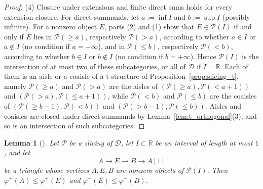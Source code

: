 \documentclass[12pt]{amsart}
\newtheorem{lemma}[theorem]{Lemma}
\numberwithin{theorem}{section}
\theoremstyle{definition}
\newcommand{\RR}{\mathbb{R}}
\newcommand{\calP}{\mathcal{P}}
\newcommand{\calD}{\mathcal{D}}
\begin{document}
\begin{proof}
		(4) Closure under extensions and finite direct sums holds for every extension closure.
		For direct summands, let $a := \inf I$ and $b := \sup I$ (possibly infinite).
		For a nonzero object $E$, parts (2) and (1) show that $E \in \calP(I)$ if and only if $E$ lies in $\calP(\geqslant a)$, respectively $\calP(> a)$, according to whether $a \in I$ or $a \notin I$ (no condition if $a = -\infty$), and in $\calP(\leqslant b)$, respectively $\calP(< b)$, according to whether $b \in I$ or $b \notin I$ (no condition if $b = +\infty$).
		Hence $\calP(I)$ is the intersection of at most two of these subcategories, or all of $\calD$ if $I = \RR$.
		Each of them is an aisle or a coaisle of a t-structure of Proposition~\ref{prop:slicing_t}, namely $\calP(\geqslant a)$ and $\calP(> a)$ are the aisles of $(\calP(\geqslant a), \calP(< a + 1))$ and $(\calP(> a), \calP(\leqslant a + 1))$, while $\calP(< b)$ and $\calP(\leqslant b)$ are the coaisles of $(\calP(\geqslant b - 1), \calP(< b))$ and $(\calP(> b - 1), \calP(\leqslant b))$.
		Aisles and coaisles are closed under direct summands by Lemma~\ref{lem:t_orthogonal}(3), and so is an intersection of such subcategories.
	\end{proof}

	\begin{lemma}[{\cite[Lemma~3.4]{Bri07}}]
		\label{lem:slicing_seesaw}
		Let $\calP$ be a slicing of $\calD$, let $I \subset \RR$ be an interval of length at most $1$, and let
		\[
		A \to E \to B \to A[1]
		\]
		be a triangle whose vertices $A, E, B$ are nonzero objects of $\calP(I)$.
		Then $\varphi^+(A) \leqslant \varphi^+(E)$ and $\varphi^-(E) \leqslant \varphi^-(B)$.
	\end{lemma}
\end{document}
